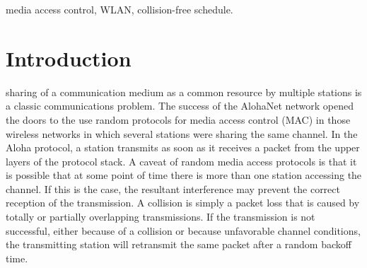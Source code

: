 \documentclass[journal]{IEEEtran}
\begin{document}
\begin{IEEEkeywords}
 media access control, WLAN, collision-free schedule.
\end{IEEEkeywords}






%
\IEEEpeerreviewmaketitle



\section{Introduction}
% 
% 
% 
% 
 sharing of a communication medium as a common resource by multiple stations is a classic communications problem. 
The success of the AlohaNet network \cite{abramson2009asw} opened the doors to the use random protocols for media access control (MAC) in those wireless networks in which several stations were sharing the same channel.
In the Aloha protocol, a station transmits as soon as it receives a packet from the upper layers of the protocol stack.
A caveat of random media access protocols is that it is possible that at some point of time there is more than one station accessing the channel.
If this is the case, the resultant interference may prevent the correct reception of the transmission.
A collision is simply a packet loss that is caused by totally or partially overlapping transmissions.
If the transmission is not successful, either because of a collision or because unfavorable channel conditions, the transmitting station will retransmit the same packet after a random backoff time.
\end{document}
